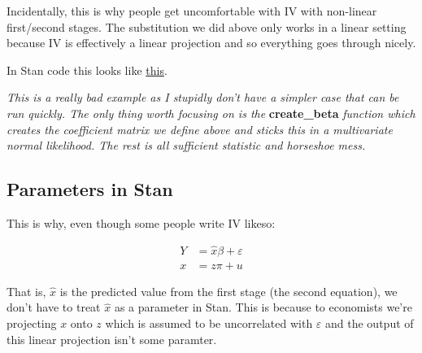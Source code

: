 \documentclass{article}
\begin{document}
Incidentally, this is why people get uncomfortable with IV with non-linear first/second 
stages. The substitution we did above only works in a linear setting because IV 
is effectively a linear projection and so everything goes through nicely.


In Stan code this looks like \href{https://gist.github.com/EdJeeOnGitHub/f728ac156da2d8dafa4dda8cd1a6b336}{this}.

\textit{This is a really bad example as I stupidly don't have a simpler case that 
can be run quickly. The only 
thing worth focusing on is the } \textbf{create\_beta} \textit{function which creates the  
coefficient matrix we define above and sticks this in a multivariate normal 
likelihood. The rest is all sufficient statistic and horseshoe mess.}

\subsection*{Parameters in Stan}
This is why, even though some people write IV likeso:

\begin{align*}
    Y &= \hat{x} \beta + \varepsilon \\
    x &= z\pi + u
\end{align*}


That is, $\hat{x}$ is the predicted value from the first stage (the second equation), 
we don't have to treat $\hat{x}$ as a parameter in Stan. This is 
because to economists we're projecting $x$ onto $z$ which is assumed to be 
uncorrelated with $\varepsilon$ and the output of this linear projection isn't some 
paramter.
\end{document}
